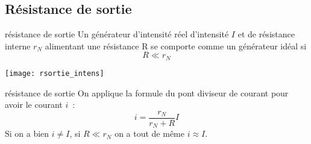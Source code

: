 \documentclass[../main/main.tex]{subfiles}
\begin{document}
\subsection{Résistance de sortie}

\begin{tcbraster}[raster columns=2, raster equal height=rows]
    \begin{prop}[label=prop:rsortie, sidebyside]{résistance de sortie}
        Un générateur d'intensité réel d'intensité $I$ et de résistance
        interne $r_N$ alimentant une résistance R se comporte comme un générateur
        idéal si
        \[ \boxed{R \ll r_N}\]
        \tcblower
        \begin{center}
            \texttt{[image: rsortie\_intens]}
        \end{center}
    \end{prop}
    \begin{demo}[label=demo:rsortie]{résistance de sortie}
        On applique la formule du pont diviseur de courant pour avoir le courant
        $i$~:
        \[ i = \frac{r_N}{r_N + R}I\]
        Si on a bien $i \neq I$, si $R \ll r_N$ on a tout de même $i \approx
        I$.
    \end{demo}
\end{tcbraster}
\end{document}
